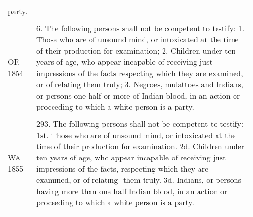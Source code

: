 \documentclass[12pt,]{article}
\begin{document}
\begin{longtable}[]{@{}ll@{}}
\begin{minipage}[t]{0.77\columnwidth}
party.\strut
\end{minipage}\tabularnewline
\begin{minipage}[t]{0.17\columnwidth}\raggedright
\strut
\end{minipage} & \begin{minipage}[t]{0.77\columnwidth}\raggedright
\strut
\end{minipage}\tabularnewline
\begin{minipage}[t]{0.17\columnwidth}\raggedright
OR 1854\strut
\end{minipage} & \begin{minipage}[t]{0.77\columnwidth}\raggedright
6. The following persons shall not be competent to testify: 1. Those who
are of unsound mind, or intoxicated at the time of their production for
examination; 2. Children under ten years of age, who appear incapable of
receiving just impressions of the facts respecting which they are
examined, or of relating them truly; 3. Negroes, mulattoes and Indians,
or persons one half or more of Indian blood, in an action or proceeding
to which a white person is a party.\strut
\end{minipage}\tabularnewline
\begin{minipage}[t]{0.17\columnwidth}\raggedright
\strut
\end{minipage} & \begin{minipage}[t]{0.77\columnwidth}\raggedright
\strut
\end{minipage}\tabularnewline
\begin{minipage}[t]{0.17\columnwidth}\raggedright
WA 1855\strut
\end{minipage} & \begin{minipage}[t]{0.77\columnwidth}\raggedright
293. The following persons shall not be competent to testify: 1st. Those
who are of unsound mind, or intoxicated at the time of their production
for examination. 2d. Children under ten years of age, who appear
incapable of receiving just impressions of the facts, respecting which
they are examined, or of relating -them truly. 3d. Indians, or persons
having more than one half Indian blood, in an action or proceeding to
which a white person is a party.\strut
\end{minipage}\tabularnewline
\begin{minipage}[t]{0.17\columnwidth}\raggedright
\strut
\end{minipage} & \begin{minipage}[t]{0.77\columnwidth}\raggedright
\strut
\end{minipage}\tabularnewline

\end{longtable}
\end{document}
